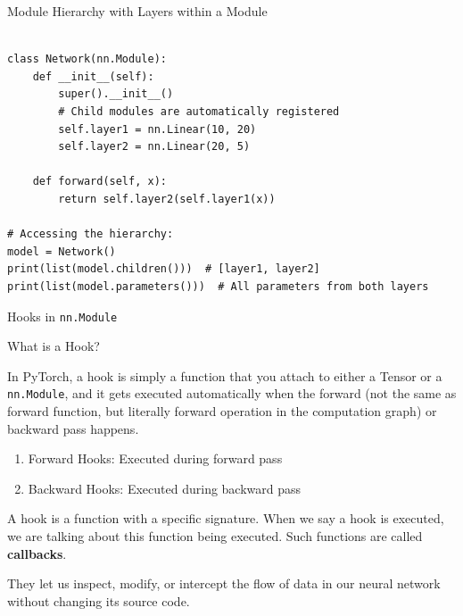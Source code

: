 \documentclass[aspectratio=169,xcolor=dvipsnames,svgnames,x11names,fleqn]{beamer}
\begin{document}
\begin{frame}[fragile]{Module Hierarchy with Layers within a Module}

    \begin{verbatim}

class Network(nn.Module):
    def __init__(self):
        super().__init__()
        # Child modules are automatically registered
        self.layer1 = nn.Linear(10, 20)
        self.layer2 = nn.Linear(20, 5)

    def forward(self, x):
        return self.layer2(self.layer1(x))
        
# Accessing the hierarchy:
model = Network()
print(list(model.children()))  # [layer1, layer2]
print(list(model.parameters()))  # All parameters from both layers

    \end{verbatim}
    
\end{frame}


\begin{frame}{Hooks in \texttt{nn.Module}}
    
    \begin{block}{What is a Hook?}

        In PyTorch, a hook is simply a function that you attach to either a Tensor or a \texttt{nn.Module}, and it gets executed automatically when the forward (not the same as forward function, but literally forward operation in the computation graph) or backward pass happens.
        
    \end{block}

    \begin{enumerate}
        \item Forward Hooks: Executed during forward pass
        \item Backward Hooks: Executed during backward pass
    \end{enumerate}

    A hook is a function with a specific signature. When we say a hook is executed, we are talking about this function being executed. Such functions are called \textbf{callbacks}.

    \vspace{5pt}
    They let us inspect, modify, or intercept the flow of data in our neural network without changing its source code.
\end{frame}
\end{document}
